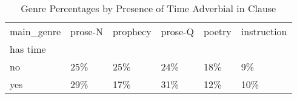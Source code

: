 \begin{table}[htbp!]
\centering
\caption{Genre Percentages by Presence of Time Adverbial in Clause}
\label{table:allcl_genre_pc}
\begin{tabular}{llllll}
\toprule
main\_genre & prose-N & prophecy & prose-Q & poetry & instruction \\
has time &         &          &         &        &             \\
\midrule
no       &     25\% &      25\% &     24\% &    18\% &          9\% \\
yes      &     29\% &      17\% &     31\% &    12\% &         10\% \\
\bottomrule
\end{tabular}
\end{table}
